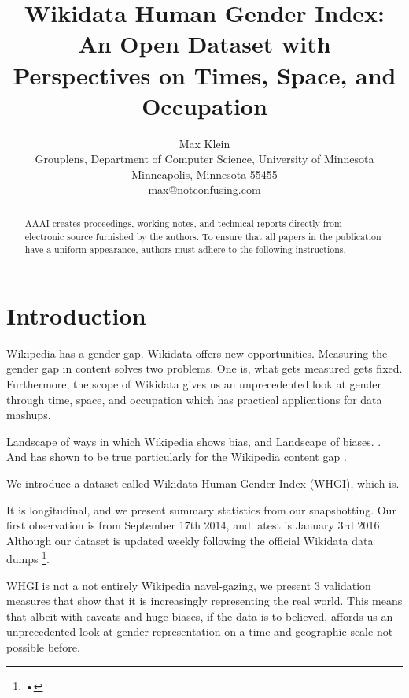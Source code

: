 \documentclass[letterpaper]{article}
\begin{document}
%
\title{Wikidata Human Gender Index: An Open Dataset with Perspectives on Times, Space, and Occupation}

\author{Max Klein \\
Grouplens, Department of Computer Science, University of Minnesota \\
Minneapolis, Minnesota 55455 \\
max@notconfusing.com\\
}
    
\maketitle
\begin{abstract}
AAAI creates proceedings, working notes, and technical reports directly from electronic source furnished by the authors. To ensure that all papers in the publication have a uniform appearance, authors must adhere to the following instructions. 
\end{abstract}


\section{Introduction}
Wikipedia has a gender gap. Wikidata offers new opportunities. \cite{wikidata-release}
Measuring the gender gap in content solves two problems. One is, what gets measured gets fixed. Furthermore, the scope of Wikidata gives us an unprecedented look at gender through time, space, and occupation which has practical applications for data mashups. 

Landscape of ways in which Wikipedia shows bias, and Landscape of biases. \cite{Wagner}. And has shown to be true particularly for the Wikipedia content gap \cite{carlosnotebook}.

We introduce a dataset called Wikidata Human Gender Index (WHGI), which is.

It is longitudinal, and we present summary statistics from our snapshotting. Our first observation is from September 17th 2014, and latest is January 3rd 2016. Although our dataset is updated weekly following the official Wikidata data dumps \footnote{•}.

WHGI is not a not entirely Wikipedia navel-gazing, we present 3 validation measures that show that it is increasingly representing the real world. This means that albeit with caveats and huge biases, if the data is to believed, affords us an unprecedented look at gender representation on a time and geographic scale not possible before.
\end{document}
